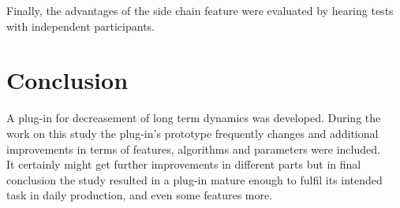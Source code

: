 Finally, the advantages of the side chain feature were evaluated by hearing tests with independent participants.\\

\section{Conclusion}

A plug-in for decreasement of long term dynamics was developed. During the work on this study the plug-in’s prototype frequently changes and additional improvements in terms of features, algorithms and parameters were included.\\
It certainly might get further improvements in different parts but in final conclusion the study resulted in a plug-in mature enough to fulfil its intended task in daily production, and even some features more.\\



